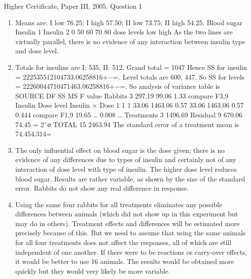 \documentclass[a4paper,12pt]{article}
\begin{document}
Higher Certificate, Paper III, 2005. Question 1
\begin{enumerate}
\item Means are: I low 76.25; I high 57.50; II low 73.75; II high 54.25.
Blood
sugar
Insulin 1
Insulin 2
0
50
60
70
80
dose levels
low
high
As the two lines are virtually parallel, there is no evidence of any interaction between insulin type and dose level.
\item Totals for insulins are I: 535, II: 512. Grand total = 1047
Hence SS for insulin = 222535512104733.06258816+−=.
Level totals are 600, 447. So SS for levels = 22260044710471463.06258816+−=.
So analysis of variance table is
SOURCE
DF
SS
MS
F value
Rabbits
3
297.19
99.06
1.33 compare F3,9
Insulin
Dose level
Insulin × Dose
1
1
1
33.06
1463.06
0.57
33.06
1463.06
0.57
0.444 compare F1,9
19.65 …
0.008 …
Treatments
3
1496.69
Residual
9
670.06
74.45
= 2ˆσ
TOTAL
15
2463.94
The standard error of a treatment mean is 74.454.314=
\item The only influential effect on blood sugar is the dose given; there is no evidence of any differences due to types of insulin and certainly not of any interaction of dose level with type of insulin. The higher dose level reduces blood sugar. Results are rather variable, as shown by the size of the standard error. Rabbits do not show any real difference in response.
\item Using the same four rabbits for all treatments eliminates any possible differences between animals (which did not show up in this experiment but may do in others). Treatment effects and differences will be estimated more precisely because of this. But we need to assume that using the same animals for all four treatments does not affect the responses, all of which are still independent of one another. If there were to be reactions or carry-over effects, it would be better to use 16 animals. The results would be obtained more quickly but they would very likely be more variable.
\end{enumerate}
\end{document}
